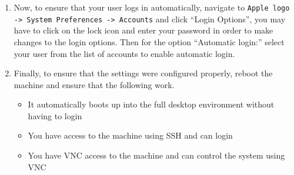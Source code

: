 \begin{enumerate}
\item	Now, to ensure that your user logs in automatically, navigate to \verb|Apple logo -> System Preferences -> Accounts| and click
		``Login Options'', you may have to click on the lock icon and enter your password in order to make changes to the login options. 
		Then for the option ``Automatic login:'' select your user from the list of accounts to enable automatic login.
		
\item 	Finally, to ensure that the settings were configured properly, reboot the machine and ensure that the following work.
\begin{itemize}
\item	It automatically boots up into the full desktop environment without having to login
\item	You have access to the machine using SSH and can login
\item	You have VNC access to the machine and can control the system using VNC	
\end{itemize}
\end{enumerate}




\newpage
